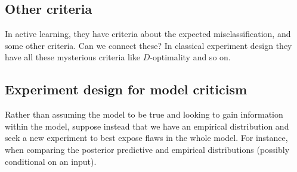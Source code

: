 \subsection{Other criteria}
In active learning, they have criteria about the expected misclassification, and some other criteria. Can we connect these? In classical experiment design they have all these mysterious criteria like $D$-optimality and so on.

\subsection{Experiment design for model criticism}
Rather than assuming the model to be true and looking to gain information within the model, suppose instead that we have an empirical distribution and seek a new experiment to best expose flaws in the whole model. For instance, when comparing the posterior predictive and empirical distributions (possibly conditional on an input).